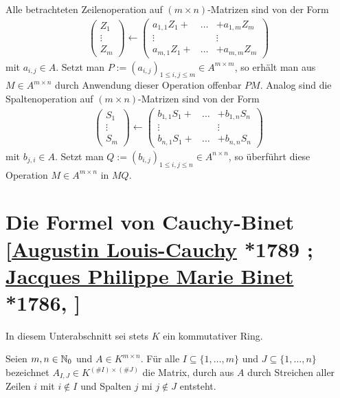 \documentclass[../../main.tex]{subfiles}
\begin{document}
\noindent Alle betrachteten Zeilenoperation auf $(m\times n)$-Matrizen sind von der Form
\begin{align*}
    \begin{pmatrix}
        Z_1\\\vdots\\ Z_m
    \end{pmatrix}\leftarrow
    \begin{pmatrix}
        a_{1,1}Z_1+&\hdots&+a_{1,m}Z_m\\
        \vdots&&\vdots\\ 
        a_{m,1}Z_1+&\hdots&+a_{m,m}Z_m
    \end{pmatrix}
\end{align*}
mit $a_{i,j}\in A$. Setzt man $P:=(a_{i,j})_{1\le i,j\le m}\in A^{m\times m}$, so erhält man aus $M\in A^{m\times n}$ durch Anwendung dieser Operation offenbar $PM$. Analog sind die Spaltenoperation auf $(m\times n)$-Matrizen sind von der Form
\begin{align*}
    \begin{pmatrix}
        S_1\\
        \vdots\\ 
        S_m
    \end{pmatrix}\leftarrow
    \begin{pmatrix}
        b_{1,1}S_1+&\hdots&+b_{1,n}S_n\\
        \vdots&&\vdots\\ 
        b_{n,1}S_1+&\hdots&+b_{n,n}S_n
    \end{pmatrix}
\end{align*}
mit $b_{j,i}\in A$. Setzt man $Q:=(b_{i,j})_{1\le i,j\le n}\in A^{n\times n}$, so überführt diese Operation $M\in A^{m\times n}$ in $MQ$.

\section[Die Formel von Cauchy-Binet]{Die Formel von Cauchy-Binet\\{\small[\href{https://de.wikipedia.org/wiki/Augustin-Louis_Cauchy}{Augustin Louis-Cauchy} *1789 ; \href{https://en.wikipedia.org/wiki/Jacques_Philippe_Marie_Binet}{Jacques Philippe Marie Binet} *1786, ]}}

In diesem Unterabschnitt sei stets $K$ ein kommutativer Ring.

\begin{df}\label{17.2.1}
    Seien $m,n\in \mathbb N_0$ und $A\in K^{m\times n}$. Für alle $I\subseteq\{1,\ldots ,m\}$ und $J\subseteq\{1,\ldots ,n\}$ bezeichnet $A_{I,J}\in K^{(\#I)\times (\#J)}$ die Matrix, durch aus $A$ durch Streichen aller Zeilen $i$ mit $i\notin I$ und Spalten $j$ mi $j\notin J$ entsteht.
\end{df}
\end{document}
